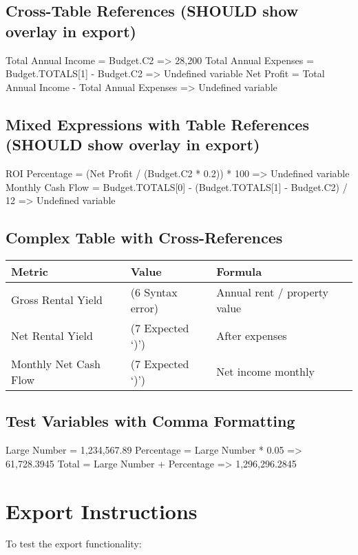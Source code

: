 \documentclass[11pt]{article}
\begin{document}
\subsection{Cross-Table References (SHOULD show overlay in export)}
\label{sec:org45b4dec}

Total Annual Income = Budget.C2 => 28,200
Total Annual Expenses = Budget.TOTALS[1] - Budget.C2 => Undefined variable
Net Profit = Total Annual Income - Total Annual Expenses => Undefined variable
\subsection{Mixed Expressions with Table References (SHOULD show overlay in export)}
\label{sec:orge4f5fe6}

ROI Percentage = (Net Profit / (Budget.C2 * 0.2)) * 100 => Undefined variable
Monthly Cash Flow = Budget.TOTALS[0] - (Budget.TOTALS[1] - Budget.C2) / 12 => Undefined variable
\subsection{Complex Table with Cross-References}
\label{sec:org83f8c83}

\begin{table}[htbp]
\label{tab:org1533887}
\centering
\begin{tabular}{lll}
Metric & Value & Formula\\
\hline
Gross Rental Yield & (6 Syntax error) & Annual rent / property value\\
Net Rental Yield & (7 Expected `)') & After expenses\\
Monthly Net Cash Flow & (7 Expected `)') & Net income monthly\\
\end{tabular}
\end{table}
\subsection{Test Variables with Comma Formatting}
\label{sec:orgdf98604}

Large Number = 1,234,567.89
Percentage = Large Number * 0.05 => 61,728.3945
Total = Large Number + Percentage => 1,296,296.2845
\section{Export Instructions}
\label{sec:org3de39c2}

To test the export functionality:
\end{document}
